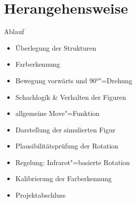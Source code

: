 
\section{Herangehensweise}

\begin{frame}{Ablauf}
    \begin{itemize}
        \item Überlegung der Strukturen
        \item Farberkennung
        \item Bewegung vorwärts und 90°"=Drehung
        \item Schachlogik \& Verhalten der Figuren
        \item allgemeine Move"=Funktion
        \item Darstellung der simulierten Figur
        \item Plausibilitätsprüfung der Rotation
        \item Regelung: Infrarot"=basierte Rotation
        \item Kalibrierung der Farberkennung
        \item Projektabschluss
    \end{itemize}
\end{frame}
